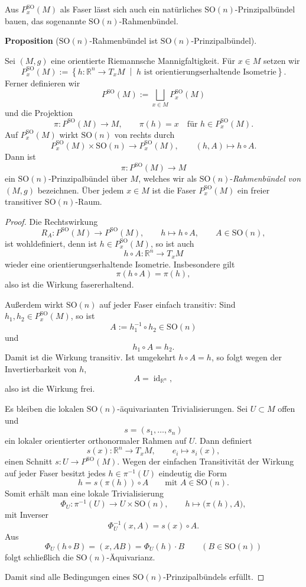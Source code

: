 \documentclass[10pt, letterpaper]{article}
\newcommand{\id}{\operatorname{id}}
\newcommand{\R}{\mathbb{R}}
\newcommand{\SO}{\mathrm{SO}}
\newcommand{\CustomHeading}[3]{%
  \par\medskip\noindent%
  \textbf{#1 #2} \textnormal{(#3)}.\enskip%
}
\newenvironment{PROP}[2]{\CustomHeading{Proposition}{#1}{#2}}{}
\begin{document}
Aus $P_x^\SO (M)$ als Faser lässt sich auch ein natürliches $\SO(n)$-Prinzipalbündel bauen, das sogenannte $\SO(n)$-Rahmenbündel.


\begin{PROP}{}{$\SO(n)$-Rahmenbündel ist $\SO(n)$-Prinzipalbündel}
Sei $(M,g)$ eine orientierte Riemannsche Mannigfaltigkeit. Für \(x\in M\) setzen wir
\[
P_x^{\SO}(M)
:=
\left\{
h:\R^n\to T_xM
\;\middle|\;
h \text{ ist orientierungserhaltende Isometrie}
\right\}.
\]
Ferner definieren wir
\[
P^{\SO}(M):=\bigsqcup_{x\in M} P_x^{\SO}(M)
\]
und die Projektion
\[
\pi:P^{\SO}(M)\to M,\qquad \pi(h)=x
\quad\text{für }h\in P_x^{\SO}(M).
\]
Auf \(P_x^{\SO}(M)\) wirkt \(\SO(n)\) von rechts durch
\[
P_x^{\SO}(M)\times \SO(n)\to P_x^{\SO}(M),
\qquad
(h,A)\mapsto h\circ A.
\]
Dann ist
\[
\pi:P^{\SO}(M)\to M
\]
ein \(\SO(n)\)-Prinzipalbündel über $M$, welches wir als $\SO(n)$-\emph{Rahmenbündel von $(M,g)$} bezeichnen. Über jedem \(x\in M\) ist die Faser \(P_x^{\SO}(M)\) ein freier transitiver \(\SO(n)\)-Raum.
\end{PROP}

\begin{proof}

Die Rechtswirkung
\[
R_A:P^{\SO}(M)\to P^{\SO}(M),\qquad h\mapsto h\circ A,
\qquad A\in \SO(n),
\]
ist wohldefiniert, denn ist \(h\in P_x^{\SO}(M)\), so ist auch
\[
h\circ A:\R^n\to T_xM
\]
wieder eine orientierungserhaltende Isometrie. Insbesondere gilt
\[
\pi(h\circ A)=\pi(h),
\]
also ist die Wirkung fasererhaltend.

Außerdem wirkt \(\SO(n)\) auf jeder Faser einfach transitiv: Sind
\(h_1,h_2\in P_x^{\SO}(M)\), so ist
\[
A:=h_1^{-1}\circ h_2\in \SO(n)
\]
und
\[
h_1\circ A=h_2.
\]
Damit ist die Wirkung transitiv. Ist umgekehrt \(h\circ A=h\), so folgt wegen
der Invertierbarkeit von \(h\),
\[
A=\id_{\R^n},
\]
also ist die Wirkung frei.

Es bleiben die lokalen \(\SO(n)\)-äquivarianten Trivialisierungen. Sei
\(U\subset M\) offen und
\[
s=(s_1,\dots,s_n)
\]
ein lokaler orientierter orthonormaler Rahmen auf \(U\). Dann definiert
\[
s(x):\R^n\to T_xM,\qquad e_i\mapsto s_i(x),
\]
einen Schnitt \(s:U\to P^{\SO}(M)\). Wegen der einfachen Transitivität der
Wirkung auf jeder Faser besitzt jedes \(h\in \pi^{-1}(U)\) eindeutig die Form
\[
h=s(\pi(h))\circ A
\qquad\text{mit }A\in \SO(n).
\]
Somit erhält man eine lokale Trivialisierung
\[
\Phi_U:\pi^{-1}(U)\to U\times \SO(n),\qquad
h\mapsto \bigl(\pi(h),A\bigr),
\]
mit Inverser
\[
\Phi_U^{-1}(x,A)=s(x)\circ A.
\]
Aus
\[
\Phi_U(h\circ B)=(x,AB)=\Phi_U(h)\cdot B
\qquad (B\in \SO(n))
\]
folgt schließlich die \(\SO(n)\)-Äquivarianz.

Damit sind alle Bedingungen eines \(\SO(n)\)-Prinzipalbündels erfüllt.
\end{proof}
\end{document}
